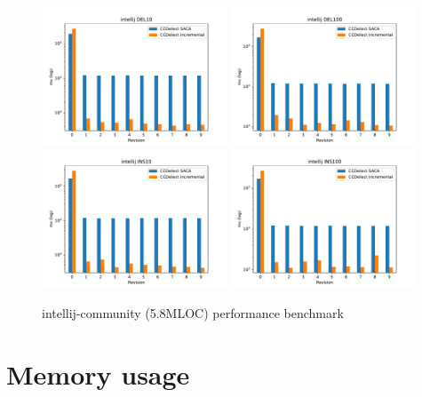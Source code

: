 \begin{figure}
    \begin{center}
        \includegraphics[width=0.49\textwidth]{figures/performancegraphs/intellij_DEL10.pdf}
        \includegraphics[width=0.49\textwidth]{figures/performancegraphs/intellij_DEL100.pdf}
        \includegraphics[width=0.49\textwidth]{figures/performancegraphs/intellij_INS10.pdf}
        \includegraphics[width=0.49\textwidth]{figures/performancegraphs/intellij_INS100.pdf}
    \end{center}
    \caption{intellij-community (5.8MLOC) performance benchmark}
    \label{fig:neo4j}
\end{figure}


\section{Memory usage}

